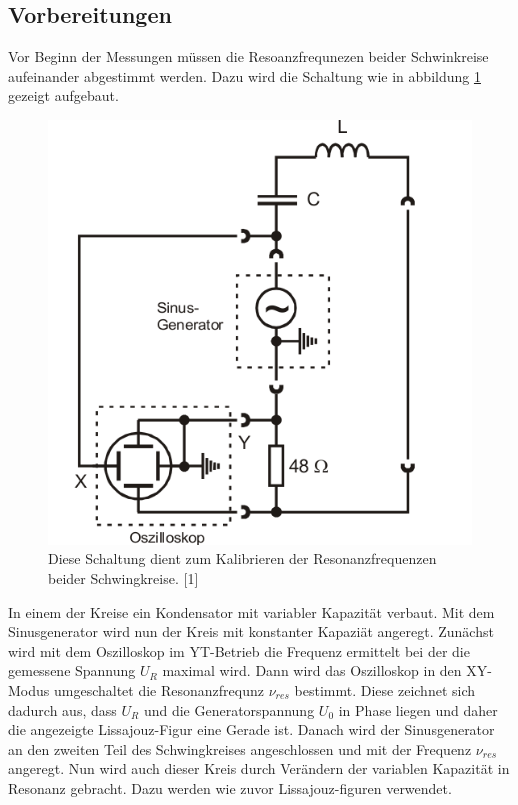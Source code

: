 \documentclass[11pt,ngerman,a4paper]{article}
\begin{document}
\subsection{Vorbereitungen}
Vor Beginn der Messungen müssen die Resoanzfrequnezen beider Schwinkreise aufeinander abgestimmt werden. Dazu wird die Schaltung wie in abbildung \ref{abb1} gezeigt aufgebaut.
\begin{figure}[htp]
\centering
\includegraphics[scale=0.5]{Abb/abb1.png}
\caption{Diese Schaltung dient zum Kalibrieren der Resonanzfrequenzen beider Schwingkreise. [1]}
\label{abb1}
\end{figure}
In einem der Kreise ein Kondensator mit variabler Kapazität verbaut. Mit dem Sinusgenerator wird nun der Kreis mit konstanter Kapazi\"at angeregt. Zunächst wird mit dem Oszilloskop im YT-Betrieb die Frequenz ermittelt bei der die gemessene Spannung $U_R$ maximal wird. Dann wird das Oszilloskop in den XY-Modus umgeschaltet die Resonanzfrequnz $\nu_{res}$ bestimmt. Diese zeichnet sich dadurch aus, dass $U_R$ und die Generatorspannung $U_0$ in Phase liegen und daher die angezeigte Lissajouz-Figur eine Gerade ist. Danach wird der Sinusgenerator an den zweiten Teil des Schwingkreises angeschlossen und mit der Frequenz $\nu_{res}$ angeregt. Nun wird auch dieser Kreis durch Verändern der variablen Kapazität in Resonanz gebracht. Dazu werden wie zuvor Lissajouz-figuren verwendet. 
\end{document}
